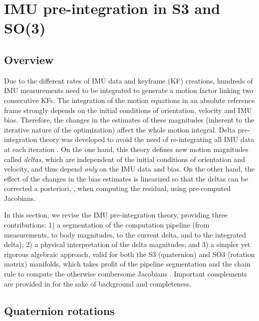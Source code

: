 




\section{IMU pre-integration in S3 and SO(3)}
\label{sec:imu}

\subsection{Overview}

Due to the different rates of IMU data and keyframe (KF) creations, hundreds of IMU measurements need to be integrated to generate a motion factor linking two consecutive KFs. 
The integration of the motion equations in an absolute reference frame strongly depends on the initial conditions of orientation, velocity and IMU bias.
Therefore, the changes in the estimates of these magnitudes (inherent to the iterative nature of the optimization) affect the whole motion integral. 
Delta pre-integration theory was developed to avoid the need of re-integrating all IMU data at each iteration \cite{LUPTON-09,forster2015imu}. 
On the one hand, this theory defines new motion magnitudes called \emph{deltas}, which are independent of the initial conditions of orientation and velocity, and thus depend \emph{only} on the IMU data and bias. 
On the other hand, the effect of the changes in the bias estimates is linearized so that the deltas can be corrected a posteriori, 
\ie, when computing the residual, 
using pre-computed Jacobians. 

In this section, we revise the IMU pre-integration theory, providing three contributions: 
1) a segmentation of the computation pipeline (from measurements, to body magnitudes, to the current delta, and to the integrated delta); 
2) a physical interpretation of the delta magnitudes; 
and 
3) a simpler yet rigorous algebraic approach, valid for both the S3 (quaternion) and SO3 (rotation matrix) manifolds, which takes profit of the pipeline segmentation and the chain rule to compute the otherwise combersome Jacobians \cite{forster2015imu}. 
Important complements are provided in  for the sake of background and completeness.

\subsection{Quaternion rotations}

